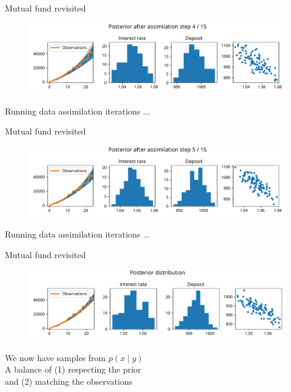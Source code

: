 \documentclass[12pt, aspectratio=149]{beamer}
\theoremstyle{plain}
\begin{document}
\begin{frame}[fragile]{Mutual fund revisited}
\vspace*{-1em}
\begin{center}
 \begin{figure}
    	\centering
    	\includegraphics[width=0.99\linewidth]{figures/esmda_step_4.pdf}
 \end{figure}
   Running data assimilation iterations ...
 \end{center}
\end{frame}

\begin{frame}[fragile]{Mutual fund revisited}
\vspace*{-1em}
\begin{center}
 \begin{figure}
    	\centering
    	\includegraphics[width=0.99\linewidth]{figures/esmda_step_5.pdf}
 \end{figure}
   Running data assimilation iterations ...
 \end{center}
\end{frame}

\begin{frame}[fragile]{Mutual fund revisited}
\vspace*{-1em}
\begin{center}
 \begin{figure}
    	\centering
    	\includegraphics[width=0.99\linewidth]{figures/esmda_posterior_no_truth.pdf}
 \end{figure}
 We now have samples from $p(x \mid y)$\\ \vspace*{1em}
 A balance of (1) respecting the prior \\and (2) matching the observations
 \end{center}
\end{frame}
\end{document}
